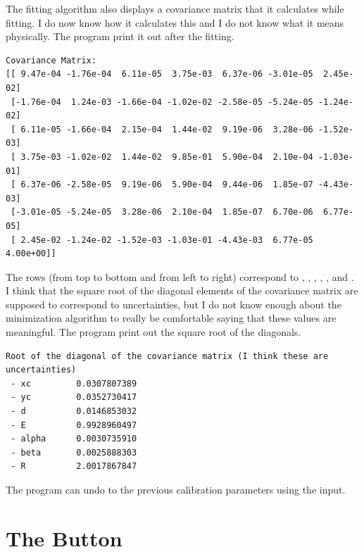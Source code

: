 The fitting algorithm also displays a covariance matrix that 
it calculates while fitting. I do now know how it calculates this 
and I do not know what it means physically. 
The program print it out after the fitting. 
\begin{lstlisting}[basicstyle=\ttfamily\footnotesize]
Covariance Matrix:
[[ 9.47e-04 -1.76e-04  6.11e-05  3.75e-03  6.37e-06 -3.01e-05  2.45e-02]
 [-1.76e-04  1.24e-03 -1.66e-04 -1.02e-02 -2.58e-05 -5.24e-05 -1.24e-02]
 [ 6.11e-05 -1.66e-04  2.15e-04  1.44e-02  9.19e-06  3.28e-06 -1.52e-03]
 [ 3.75e-03 -1.02e-02  1.44e-02  9.85e-01  5.90e-04  2.10e-04 -1.03e-01]
 [ 6.37e-06 -2.58e-05  9.19e-06  5.90e-04  9.44e-06  1.85e-07 -4.43e-03]
 [-3.01e-05 -5.24e-05  3.28e-06  2.10e-04  1.85e-07  6.70e-06  6.77e-05]
 [ 2.45e-02 -1.24e-02 -1.52e-03 -1.03e-01 -4.43e-03  6.77e-05  4.00e+00]]
\end{lstlisting}
The rows (from top to bottom and from left to right) correspond 
to , , 
, , , and . 
I think that the square root of the diagonal elements of the covariance 
matrix are supposed to correspond to uncertainties, but I do not know 
enough about the minimization algorithm to really be comfortable saying 
that these values are meaningful. The program print out the square root of 
the diagonals. 
\begin{lstlisting}[basicstyle=\ttfamily\footnotesize]
Root of the diagonal of the covariance matrix (I think these are uncertainties)
 - xc         0.0307807389
 - yc         0.0352730417
 - d          0.0146853032
 - E          0.9928960497
 - alpha      0.0030735910
 - beta       0.0025888303
 - R          2.0017867847
\end{lstlisting}
The program can undo to the previous calibration
parameters using the  input.

\section{\texorpdfstring{The  
        Button}{The ``Save Last Fit'' Button}}

